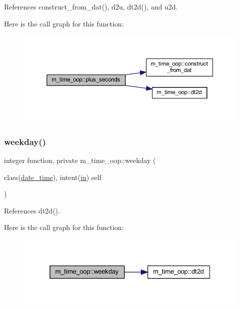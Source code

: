 References construct\+\_\+from\+\_\+dat(), d2u, dt2d(), and u2d.

Here is the call graph for this function\+:
\nopagebreak
\begin{figure}[H]
\begin{center}
\leavevmode
\includegraphics[width=350pt]{namespacem__time__oop_a6830c1cce303ec401ac8e4333a5a73d4_cgraph}
\end{center}
\end{figure}
\mbox{\label{namespacem__time__oop_ad290beea1dd0dc3d34486e8b4cd8a86c}} 
\subsubsection{\texorpdfstring{weekday()}{weekday()}}
{\footnotesize\ttfamily integer function, private m\+\_\+time\+\_\+oop\+::weekday (\begin{DoxyParamCaption}\item[{class(\hyperlink{structm__time__oop_1_1date__time}{date\+\_\+time}), intent(\hyperlink{M__journal_83_8txt_afce72651d1eed785a2132bee863b2f38}{in})}]{self }\end{DoxyParamCaption})\hspace{0.3cm}{\ttfamily [private]}}



References dt2d().

Here is the call graph for this function\+:
\nopagebreak
\begin{figure}[H]
\begin{center}
\leavevmode
\includegraphics[width=325pt]{namespacem__time__oop_ad290beea1dd0dc3d34486e8b4cd8a86c_cgraph}
\end{center}
\end{figure}
